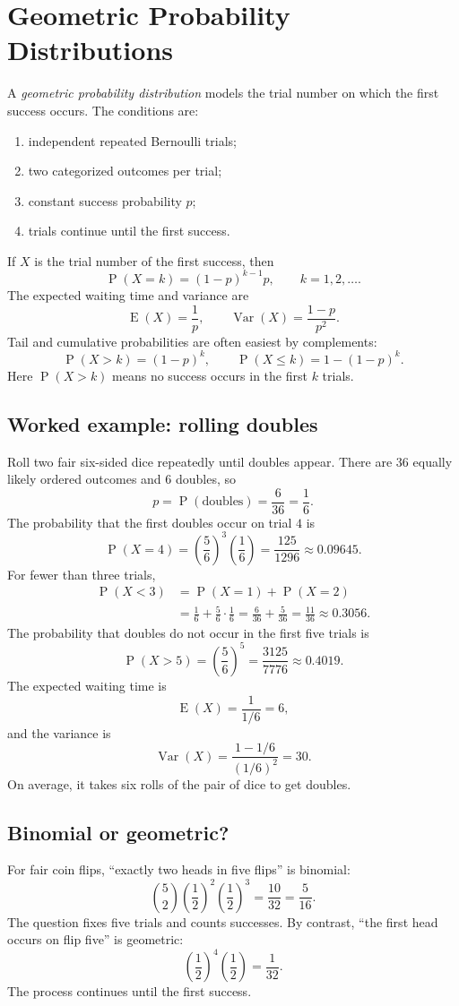 \documentclass[11pt]{article}
\newcommand{\Pp}{\operatorname{P}}
\newcommand{\E}{\operatorname{E}}
\newcommand{\Var}{\operatorname{Var}}
\begin{document}
\section{Geometric Probability Distributions}\label{sec:geometric}
A \emph{geometric probability distribution} models the trial number on which the
first success occurs.  The conditions are:
\begin{enumerate}
\item independent repeated Bernoulli trials;
\item two categorized outcomes per trial;
\item constant success probability $p$;
\item trials continue until the first success.
\end{enumerate}
If $X$ is the trial number of the first success, then
\[
\Pp(X=k)=(1-p)^{k-1}p,
\qquad k=1,2,\ldots.
\]
The expected waiting time and variance are
\[
\E(X)=\frac{1}{p},
\qquad
\Var(X)=\frac{1-p}{p^2}.
\]
Tail and cumulative probabilities are often easiest by complements:
\[
\Pp(X>k)=(1-p)^k,
\qquad
\Pp(X\leq k)=1-(1-p)^k.
\]
Here $\Pp(X>k)$ means no success occurs in the first $k$ trials.

\subsection{Worked example: rolling doubles}
Roll two fair six-sided dice repeatedly until doubles appear.  There are $36$
equally likely ordered outcomes and $6$ doubles, so
\[
p=\Pp(\text{doubles})=\frac{6}{36}=\frac16.
\]
The probability that the first doubles occur on trial $4$ is
\[
\Pp(X=4)=\left(\frac56\right)^3\left(\frac16\right)
=\frac{125}{1296}\approx0.09645.
\]
For fewer than three trials,
\begin{align*}
\Pp(X<3)&=\Pp(X=1)+\Pp(X=2)\\
&=\frac16+\frac56\cdot\frac16
=\frac{6}{36}+\frac{5}{36}
=\frac{11}{36}\approx0.3056.
\end{align*}
The probability that doubles do not occur in the first five trials is
\[
\Pp(X>5)=\left(\frac56\right)^5=\frac{3125}{7776}\approx0.4019.
\]
The expected waiting time is
\[
\E(X)=\frac{1}{1/6}=6,
\]
and the variance is
\[
\Var(X)=\frac{1-1/6}{(1/6)^2}=30.
\]
On average, it takes six rolls of the pair of dice to get doubles.

\subsection{Binomial or geometric?}
For fair coin flips, ``exactly two heads in five flips'' is binomial:
\[
\binom52\left(\frac12\right)^2\left(\frac12\right)^3=\frac{10}{32}=\frac{5}{16}.
\]
The question fixes five trials and counts successes.  By contrast, ``the first
head occurs on flip five'' is geometric:
\[
\left(\frac12\right)^4\left(\frac12\right)=\frac{1}{32}.
\]
The process continues until the first success.
\end{document}
